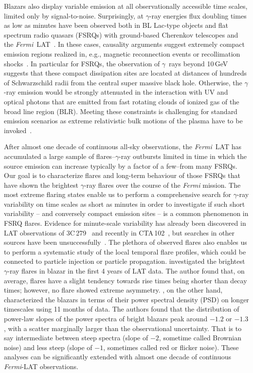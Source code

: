 \documentclass[twocolumn,linenumbers]{aastex62}
\newcommand{\Grays}{$\gamma$~rays\xspace}
\newcommand{\gray}{$\gamma$-ray\xspace}
\newcommand{\Fermi}{\emph{Fermi}\xspace}
\newcommand{\FermiLAT}{\emph{Fermi}~LAT\xspace}
\newcommand{\fermiLAT}{\emph{Fermi}-LAT\xspace}
\begin{document}
Blazars also display variable emission at all observationally accessible time scales, limited only by signal-to-noise.
Surprisingly, at \gray energies flux doubling times as low as minutes have been observed both in BL Lac-type objects and flat spectrum radio quasars (FSRQs) with ground-based Cherenkov telescopes and the \FermiLAT~\cite[e.g.,][]{2007ApJ...669..862A,pks2155hess2007,pks1222magic2011,2013ApJ...762...92A,2014Sci...346.1080A,TheFermi-LAT:2016dss,2018ApJ...854L..26S}.
In these cases, causality arguments suggest extremely compact emission regions realized in, e.g., magnetic reconnection events or recollimation shocks~\cite[e.g.][]{Petropoulou:2016xat,Bodo:2017qqn}.
In particular for FSRQs, the observation of \Grays beyond 10\,GeV suggests that these compact dissipation sites are located at distances of hundreds of Schwarzschild  radii from the central super massive black hole. 
Otherwise, the \gray emission would be strongly attenuated in the interaction with UV and optical photons that are emitted from fast rotating clouds of ionized gas of the broad line region (BLR). 
Meeting these constraints is challenging for standard emission scenarios as extreme relativistic bulk motions of the plasma have to be invoked~\cite[e.g.,][]{TheFermi-LAT:2016dss}. 

After almost one decade of continuous all-sky observations, the \FermiLAT has accumulated a large sample of flares--\gray outbursts limited in time in which the source emission can increase typically by a factor of a few--from many FSRQs.
Our goal is to characterize flares and long-term behaviour of those FSRQs that have shown the brightest \gray flares over the course of the \Fermi mission. 
The most extreme flaring states enable us to perform a comprehensive search for \gray variability on time scales as short as minutes in order to investigate if such short variability -- and conversely compact emission sites -- is a common phenomenon in FSRQ flares. 
Evidence for minute-scale variability has already been discovered in LAT observations of 3C\,279~\citep{TheFermi-LAT:2016dss} and recently in CTA\,102~\citep{2018ApJ...854L..26S}, but searches in other sources have been unsuccessfully~\citep{2017Galax...5..100N}.
The plethora of observed flares also enables us to perform a systematic study of the local temporal flare profiles, which could be connected to particle injection or particle propagation.
\citet{2013MNRAS.430.1324N} investigated the brightest \gray flares in blazar in the first 4 years of LAT data.
The author found that, on average, flares have a slight tendency towards rise times being shorter than decay times; however, no flare showed extreme asymmetry. 
\citet{2010ApJ...722..520A}, on the other hand, characterized the blazars in terms of their power spectral density (PSD) on longer timescales using 11 months of data.
The authors found that the distribution of power-law slopes of the power spectra of bright blazars peak around $-1.2$ or $-1.3$, with a scatter marginally larger than the observational uncertainty.  That is to say intermediate between steep spectra (slope of $-2$, sometime called Brownian noise) and less steep (slope of $-1$, sometimes called red or flicker noise).
These analyses can be significantly extended with almost one decade of continuous \fermiLAT observations.
\end{document}
